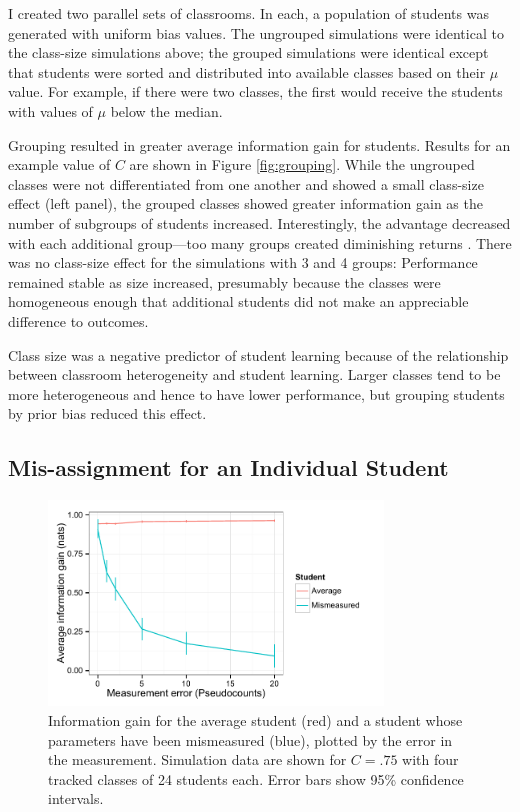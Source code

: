 \documentclass[10pt,letterpaper]{article}
\begin{document}
I created two parallel sets of classrooms. In each, a population of students was generated with uniform bias values. The ungrouped simulations were identical to the class-size simulations above; the grouped simulations were identical except that students were sorted and distributed into available classes based on their $\mu$ value. For example, if there were two classes, the first would receive the students with values of $\mu$ below the median. 

Grouping resulted in greater average information gain for students. Results for an example value of $C$ are shown in Figure \ref{fig:grouping}. While the ungrouped classes were not differentiated from one another and showed a small class-size effect (left panel), the grouped classes showed greater information gain as the number of subgroups of students increased. Interestingly, the advantage decreased with each additional group---too many groups created diminishing returns \cite{tomlinson1999}. There was no class-size effect for the simulations with 3 and 4 groups: Performance remained stable as size increased, presumably because the classes were homogeneous enough that additional students did not make an appreciable difference to outcomes.  

Class size was a negative predictor of student learning because of the relationship between classroom heterogeneity and student learning. Larger classes tend to be more heterogeneous and hence to have lower performance, but grouping students by prior bias reduced this effect.

\subsection{Mis-assignment for an Individual Student}

\begin{figure}
\begin{center}
\includegraphics[width=3.5in]{figures/mismeasured.pdf}
\end{center}
\vspace{-2ex}
\caption{\label{fig:mismeasure} Information gain for the average student (red) and a student whose parameters have been mismeasured (blue), plotted by the error in the measurement. Simulation data are shown for $C=.75$ with four tracked classes of 24 students each. Error bars show 95\% confidence intervals.}
\vspace{-2ex}
\end{figure}
\end{document}
